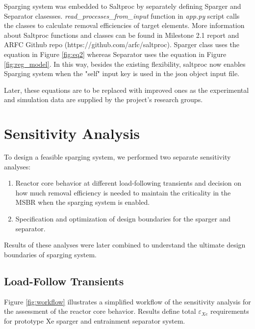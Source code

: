     Sparging system was embedded to Saltproc by separately defining Sparger and 
    Separator clasesses. \textit{read\_processes\_from\_input} function in 
    \textit{app.py} script calls the classes to calculate removal efficiencies 
    of target elements. More information about Saltproc functions and classes 
    can be found in Milestone 2.1 report \cite{rykhlevskii_milestone_2019} and 
    ARFC Github repo (https://github.com/arfc/saltproc). Sparger class uses the 
    equation in Figure \ref{fig:eq2} whereas Separator uses the equation in 
    Figure \ref{fig:reg_model}. In this way, besides the existing flexibility, 
    saltproc now enables Sparging system when the "self" input key is used in 
    the json object input file.

    Later, these equations are to be replaced with improved ones as the 
    experimental and simulation data are supplied by the project's research 
    groups.

\FloatBarrier

\section{Sensitivity Analysis}

    To design a feasible sparging system, we performed two separate sensitivity 
    analyses:

    \begin{enumerate}
        \item Reactor core behavior at different load-following transients and 
                decision on how much removal efficiency is needed to maintain 
                    the criticality in the MSBR when the sparging system is 
                    enabled.
        \item Specification and optimization of design boundaries for the 
                sparger and separator.
    \end{enumerate}

    Results of these analyses were later combined to understand the ultimate 
    design boundaries of sparging system.

\subsection{Load-Follow Transients}

    Figure \ref{fig:workflow} illustrates a simplified workflow of the 
    sensitivity analysis for the assessment of the reactor core behavior. 
    Results define total $\varepsilon$$_{Xe}$ requirements for prototype Xe 
    sparger and entrainment separator system.

